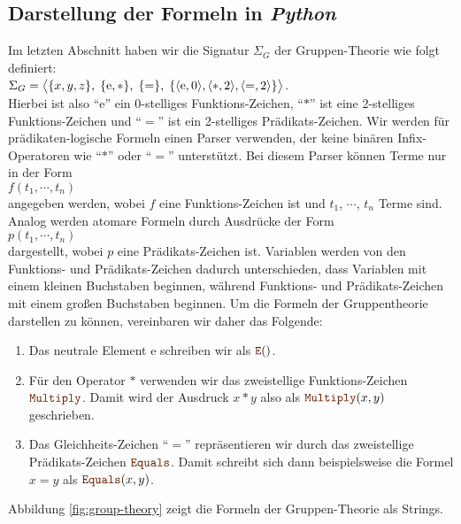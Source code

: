 \subsection{Darstellung der Formeln in \textsl{Python}}
Im letzten Abschnitt haben wir die Signatur $\Sigma_G$ der
Gruppen-Theorie wie folgt definiert:
\\[0.2cm]
\hspace*{1.3cm}
$\Sigma_G = 
   \bigl\langle \{x,y,z\},\; \{\mathrm{e},*\},\; \{=\},\; \{ \pair(\mathrm{e},0), \pair(*,2), \pair(=,2) \} \bigr\rangle 
$.
\\[0.2cm]
Hierbei ist also ``$\mathrm{e}$'' ein 0-stelliges Funktions-Zeichen, ``$*$'' ist
eine 2-stelliges Funktions-Zeichen und ``$=$'' ist ein 2-stelliges Prädikats-Zeichen.
Wir werden für prädikaten-logische Formeln einen Parser verwenden, der keine binären Infix-Operatoren wie
``$*$'' oder ``$=$'' unterstützt.  Bei diesem Parser können Terme nur in der Form
\\[0.2cm]
\hspace*{1.3cm}
$f(t_1,\cdots,t_n)$
\\[0.2cm]
angegeben werden, wobei $f$ eine Funktions-Zeichen ist und $t_1$, $\cdots$, $t_n$ Terme sind.  Analog werden
atomare Formeln durch Ausdrücke der Form
\\[0.2cm]
\hspace*{1.3cm}
$p(t_1,\cdots,t_n)$
\\[0.2cm]
dargestellt, wobei $p$ eine Prädikats-Zeichen ist.  Variablen werden von den Funktions- und Prädikats-Zeichen
dadurch unterschieden, dass Variablen mit einem kleinen Buchstaben beginnen, während Funktions- und
Prädikats-Zeichen mit einem großen Buchstaben beginnen.  Um die Formeln der Gruppentheorie darstellen zu
können, vereinbaren wir daher das Folgende:
\begin{enumerate}
\item Das neutrale Element $\mathrm{e}$ schreiben wir als $\mytt{E}()$.  
\item Für den Operator $*$ verwenden wir das zweistellige Funktions-Zeichen $\mytt{Multiply}$.
      Damit wird der Ausdruck $x*y$ also als $\mytt{Multiply}(x, y)$ geschrieben.
\item Das Gleichheits-Zeichen ``$=$'' repräsentieren wir durch das zweistellige Prädikats-Zeichen
      $\mytt{Equals}$.  Damit schreibt sich dann beispielsweise die Formel $x = y$ als $\mytt{Equals}(x, y)$.
\end{enumerate}
Abbildung \ref{fig:group-theory} zeigt die Formeln der Gruppen-Theorie als Strings.


